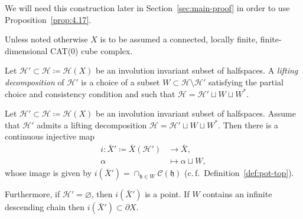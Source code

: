 We will need this construction later in Section~\ref{sec:main-proof} in order to use Proposition~\ref{prop:4.17}.

Unless noted otherwise \(X\) is to be assumed a connected, locally finite, finite-dimensional CAT(0) cube complex.

\begin{defin}
  Let \(\mathcal{H}' \subset \mathcal{H} \coloneqq \mathcal{H}(X)\) be an involution invariant subset of halfspaces. A \emph{lifting decomposition} of \(\mathcal{H}'\) is a choice of a subset \(W \subset \mathcal{H} \setminus \mathcal{H}'\) satisfying the partial choice and consistency condition and such that \(\mathcal{H} = \mathcal{H}' \sqcup W \sqcup W^\ast\).
\end{defin}

\begin{lemma}[{\cite[Lemma~2.6]{MR3509968}}]
  \label{lem:lifting}
  Let \(\mathcal{H}' \subset \mathcal{H} \coloneqq \mathcal{H}(X)\) be an involution invariant subset of halfspaces. Assume that \(\mathcal{H}'\) admits a lifting decomposition \(\mathcal{H} = \mathcal{H}' \sqcup W \sqcup W^\ast\). Then there is a continuous injective map
  \begin{align*}
    i\colon \bar X' \coloneqq \bar X(\mathcal{H}') & \to \bar X,\\
            \alpha & \mapsto \alpha \sqcup W,
  \end{align*}
  whose image is given by \(i(\bar X') = \cap_{\mathfrak{h} \in W} \mathcal{C}(\mathfrak{h})\) (c.\,f.\ Definition~\ref{def:pot-top}).

  Furthermore, if \(\mathcal{H}' = \varnothing\), then \(i(\bar X')\) is a point. If \(W\) contains an infinite descending chain then \(i(\bar X') \subset \partial X\).
\end{lemma}

